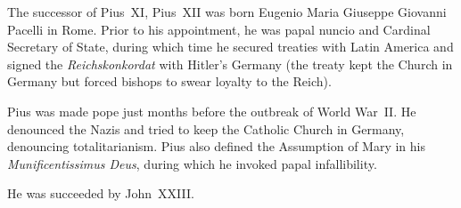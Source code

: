 
The successor of Pius~XI,
Pius~XII was born Eugenio Maria Giuseppe Giovanni Pacelli in Rome.
Prior to his appointment, he was papal nuncio and Cardinal Secretary of State,
during which time he secured treaties with Latin America
and signed the \textit{Reichskonkordat} with Hitler's Germany
(the treaty kept the Church in Germany but forced bishops to swear loyalty to the Reich).

Pius was made pope just months before the outbreak of World War~II\@.
He denounced the Nazis and tried to keep the Catholic Church in Germany,
denouncing totalitarianism.
Pius also defined the Assumption of Mary in his \textit{Munificentissimus Deus},
during which he invoked papal infallibility.

He was succeeded by John~XXIII\@.
